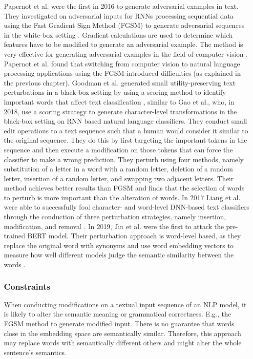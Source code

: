     Papernot et al. were the first in 2016 to generate adversarial examples in text. They investigated on adversarial inputs for RNNs processing sequential data using the Fast Gradient Sign Method (FGSM) to generate adversarial sequences in the white-box setting \cite{papernot2016crafting}. 
    Gradient calculations are used to determine which features have to be modified to generate an adversarial example. The method is very effective for generating adversarial examples in the field of computer vision \cite{goodfellow2014explaining}.
    Papernot et al. found that switching from computer vision to natural language processing applications using the FGSM introduced difficulties (as explained in the previous chapter). 
    Goodman et al. generated small utility-preserving text perturbations in a black-box setting by using a scoring method to identify important words that affect text classification \cite{goodman2020fastwordbug}, similar to Gao et al., who, in 2018, use a scoring strategy to generate character-level transformations in the black-box setting on RNN based natural language classifiers. They conduct small edit operations to a text sequence such that a human would consider it similar to the original sequence. They do this by first targeting the important tokens in the sequence and then execute a modification on those tokens that can force the classifier to make a wrong prediction. They perturb using four methods, namely substitution of a letter in a word with a random letter, deletion of a random letter, insertion of a random letter, and swapping two adjacent letters. Their method achieves better results than FGSM  and finds that the selection of words to perturb is more important than the alteration of words\cite{gao2018black}.  In 2017 Liang et al. were able to successfully fool character- and word-level DNN-based text classifiers through the conduction of three perturbation strategies, namely insertion, modification, and removal \cite{liang2017deep}. In 2019, Jin et al. were the first to attack the pre-trained BERT model. Their perturbation approach is word-level based, as they replace the original word with synonyms and use word embedding vectors to measure how well different models judge the semantic similarity between the words \cite{jin2019bert}.
    
    
\subsubsection{Constraints}
    When conducting modifications on a textual input sequence of an NLP model, it is likely to alter the semantic meaning or grammatical correctness. E.g.,  the FGSM method to generate modified input. There is no guarantee that words close in the embedding space are semantically similar. Therefore, this approach may replace words with semantically different others and might alter the whole sentence's semantics.
    
